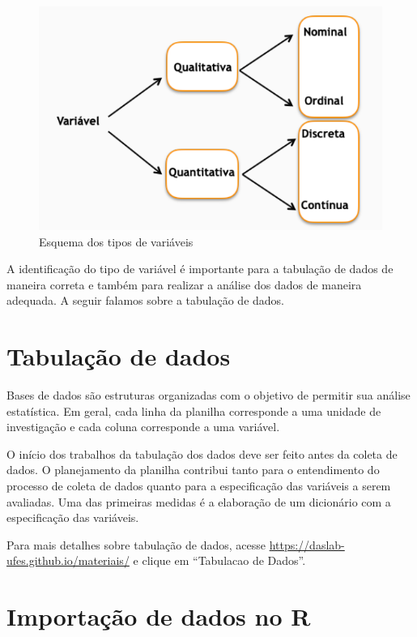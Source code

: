 \documentclass[
]{book}
\begin{document}
\begin{figure}
\includegraphics[width=1\linewidth]{figures/tipos_variaveis} \caption{Esquema dos tipos de variáveis}\label{fig:tiposVars}
\end{figure}

A identificação do tipo de variável é importante para a tabulação de dados de maneira correta e também para realizar a análise dos dados de maneira adequada. A seguir falamos sobre a tabulação de dados.

\hypertarget{tabulauxe7uxe3o-de-dados}{%
\section{Tabulação de dados}\label{tabulauxe7uxe3o-de-dados}}

Bases de dados são estruturas organizadas com o objetivo de permitir sua análise estatística. Em geral, cada linha
da planilha corresponde a uma unidade de investigação e cada coluna corresponde a uma variável.

O início dos trabalhos da tabulação dos dados deve ser feito antes da coleta de dados. O planejamento da planilha contribui tanto para o entendimento do processo de coleta de dados quanto para a especificação das variáveis a serem avaliadas. Uma das primeiras medidas é a elaboração de um dicionário com a especificação das variáveis.

Para mais detalhes sobre tabulação de dados, acesse \url{https://daslab-ufes.github.io/materiais/} e clique em ``Tabulacao de Dados''.

\hypertarget{importauxe7uxe3o-de-dados-no-r}{%
\section{Importação de dados no R}\label{importauxe7uxe3o-de-dados-no-r}}
\end{document}
